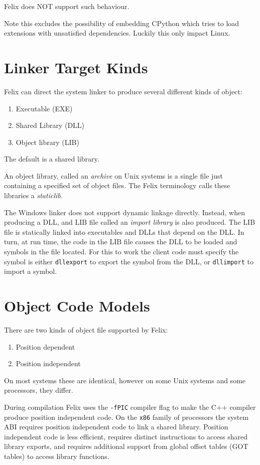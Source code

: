 \documentclass[oneside]{book}
\begin{document}
Felix does NOT support such behaviour.

Note this excludes
the possibility of embedding CPython which tries to load
extensions with unsatisfied dependencies. Luckily this
only impact Linux.

\chapter{Linker Target Kinds}
Felix can direct the system linker to produce
several different kinds of object:

\begin{enumerate}
\item Executable (EXE)
\item Shared Library (DLL)
\item Object library (LIB) 
\end{enumerate}

The default is a shared library. 

An object library, called an {\em archive} on Unix 
systems is a single file just containing a specified
set of object files. The Felix terminology calls
these libraries a {\em staticlib}.

The Windows linker does not support dynamic linkage
directly. Instead, when producing a DLL, and LIB file
called an {\em import library} is also produced.
The LIB file is statically linked into executables
and DLLs that depend on the DLL. In turn, at run time,
the code in the LIB file causes the DLL to be loaded
and symbols in the file located. For this to work
the client code must specify the symbol is either
\verb$dllexport$ to export the symbol from the DLL,
or \verb$dllimport$ to import a symbol. 

\chapter{Object Code Models}
There are two kinds of object file supported by Felix:
\begin{enumerate}
\item Position dependent 
\item Position independent
\end{enumerate}

On most systems these are identical, however on some Unix systems
and some processors, they differ. 

During compilation Felix uses the \verb$-fPIC$
compiler flag to make the C++ compiler produce position independent
code. On the \verb$x86$ family of processors the system ABI requires position
independent code to link a shared library. Position independent
code is less efficient, requires distinct instructions to
access shared library exports, and requires additional support
from global offset tables (GOT tables) to access library
functions.
\end{document}
